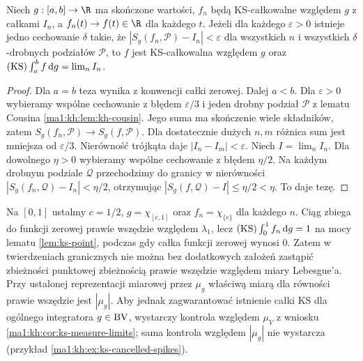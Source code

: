 \begin{twierdzenie}\label{it:thm:ks-equiintegrability}
Niech $g:[a,b]\to\R$ ma skończone wartości, $f_n$ będą
KS-całkowalne względem $g$ z całkami $I_n$, a
$f_n(t)\to f(t)\in\R$ dla każdego $t$.
Jeżeli dla każdego $\varepsilon>0$ istnieje jedno
cechowanie $\delta$ takie, że
$|S_g(f_n,\mathcal P)-I_n|<\varepsilon$ dla wszystkich $n$
i wszystkich $\delta$-drobnych podziałów $\mathcal P$,
to $f$ jest KS-całkowalna względem $g$ oraz
$(\mathrm{KS})\int_a^b f\,\mathrm dg=\lim_n I_n$.
\end{twierdzenie}
\begin{proof}
Dla $a=b$ teza wynika z konwencji całki zerowej.
Dalej $a<b$. Dla $\varepsilon>0$ wybieramy wspólne
cechowanie z błędem $\varepsilon/3$ i jeden drobny
podział $\mathcal P$ z lematu Cousina
\ref{ma1:kh:lem:kh-cousin}. Jego suma ma skończenie wiele składników,
zatem $S_g(f_n,\mathcal P)\to S_g(f,\mathcal P)$.
Dla dostatecznie dużych $n,m$ różnica sum jest mniejsza
od $\varepsilon/3$. Nierówność trójkąta daje
$|I_n-I_m|<\varepsilon$. Niech $I=\lim_n I_n$.
Dla dowolnego $\eta>0$ wybieramy wspólne cechowanie
z błędem $\eta/2$. Na każdym drobnym podziale $\mathcal Q$
przechodzimy do granicy w nierówności
$|S_g(f_n,\mathcal Q)-I_n|<\eta/2$, otrzymując
$|S_g(f,\mathcal Q)-I|\le\eta/2<\eta$. To daje tezę.
\end{proof}

\begin{przyklad}\label{it:ex:ks-atom-convergence}
Na $[0,1]$ ustalmy $c=1/2$, $g=\chi_{[c,1]}$
oraz $f_n=\chi_{\{c\}}$ dla każdego $n$. Ciąg zbiega
do funkcji zerowej prawie wszędzie względem $\lambda_1$,
lecz $(\mathrm{KS})\int_0^1 f_n\,\mathrm dg=1$ na mocy
lematu \ref{lem:ks-point}, podczas gdy całka funkcji
zerowej wynosi $0$. Zatem w twierdzeniach granicznych
nie można bez dodatkowych założeń zastąpić zbieżności
punktowej zbieżnością prawie wszędzie względem miary
Lebesgue'a. Przy ustalonej reprezentacji miarowej przez $\mu_g$ właściwą miarą dla równości prawie wszędzie jest $|\mu_g|$. Aby jednak zagwarantować istnienie całki KS dla ogólnego integratora $g\in\mathrm{BV}$, wystarczy kontrola względem $\mu_V$ z wniosku \ref{ma1:kh:cor:ks-measure-limits}; sama kontrola względem $|\mu_g|$ nie wystarcza (przykład \ref{ma1:kh:ex:ks-cancelled-spikes}).
\end{przyklad}

